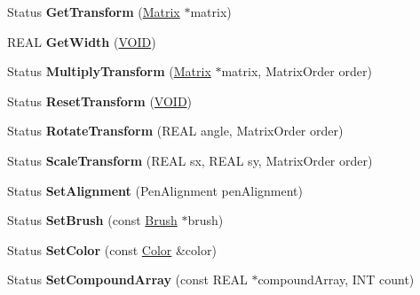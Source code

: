 \begin{DoxyCompactItemize}
\item 
\mbox{\label{class_pen_a07805e00182df8e285ad0f1de6ee5371}} 
Status {\bfseries Get\+Transform} (\hyperlink{class_matrix}{Matrix} $\ast$matrix)
\item 
\mbox{\label{class_pen_acf9395401899648494bac200fcafa118}} 
R\+E\+AL {\bfseries Get\+Width} (\hyperlink{interfacevoid}{V\+O\+ID})
\item 
\mbox{\label{class_pen_a7b5c875f0518887a0a6d28c827f877c2}} 
Status {\bfseries Multiply\+Transform} (\hyperlink{class_matrix}{Matrix} $\ast$matrix, Matrix\+Order order)
\item 
\mbox{\label{class_pen_a1118e2b91462260eabd7494aa38d583a}} 
Status {\bfseries Reset\+Transform} (\hyperlink{interfacevoid}{V\+O\+ID})
\item 
\mbox{\label{class_pen_a81af3778b630fe6f2a38a291312c1781}} 
Status {\bfseries Rotate\+Transform} (R\+E\+AL angle, Matrix\+Order order)
\item 
\mbox{\label{class_pen_a188c1ba10931f2b83cc84ed7c988c15d}} 
Status {\bfseries Scale\+Transform} (R\+E\+AL sx, R\+E\+AL sy, Matrix\+Order order)
\item 
\mbox{\label{class_pen_a51ad617227a49c065c27ac1eb2ab2213}} 
Status {\bfseries Set\+Alignment} (Pen\+Alignment pen\+Alignment)
\item 
\mbox{\label{class_pen_ac5e8d6ea21677d7db14d5df563b8b3e4}} 
Status {\bfseries Set\+Brush} (const \hyperlink{class_brush}{Brush} $\ast$brush)
\item 
\mbox{\label{class_pen_a3ee95445d42c7e43c4147e3210b8ade2}} 
Status {\bfseries Set\+Color} (const \hyperlink{struct_color}{Color} \&color)
\item 
\mbox{\label{class_pen_a9f4bece2a9059198bce9105a6694c04d}} 
Status {\bfseries Set\+Compound\+Array} (const R\+E\+AL $\ast$compound\+Array, I\+NT count)
\item 
\mbox{\label{class_pen_a4a9d9fe6e3f6cde4c183e0a65f27effe}} 

\end{DoxyCompactItemize}
